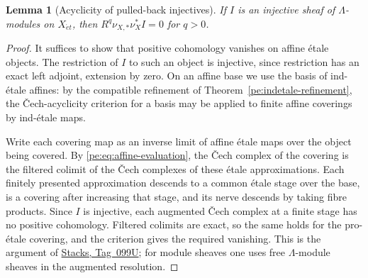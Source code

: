 \documentclass[11pt,a4paper]{article}
\numberwithin{equation}{section}
\newtheorem{lemma}[theorem]{Lemma}
\theoremstyle{definition}
\theoremstyle{remark}
\newcommand{\et}{\acute{e}t}
\newcommand{\stacks}[1]{\href{https://stacks.math.columbia.edu/tag/#1}{\textnormal{Stacks, Tag~#1}}}
\begin{document}
\begin{lemma}[Acyclicity of pulled-back injectives]
\label{pe:injective-acyclicity}
If $I$ is an injective sheaf of $\Lambda$-modules on $X_{\et}$, then
$R^q\nu_{X,*}\nu_X^*I=0$ for $q>0$.
\end{lemma}
\begin{proof}
It suffices to show that positive cohomology vanishes on affine
\'etale objects. The restriction of $I$ to such an object is
injective, since restriction has an exact left adjoint, extension by
zero. On an affine base we use the basis of ind-\'etale affines: by
the compatible refinement of Theorem~\ref{pe:indetale-refinement},
the \v{C}ech-acyclicity criterion for a basis may be applied to finite
affine coverings by ind-\'etale maps.

Write each covering map as an inverse limit of affine \'etale maps
over the object being covered. By \eqref{pe:eq:affine-evaluation}, the
\v{C}ech complex of the covering is the filtered colimit of the
\v{C}ech complexes of these \'etale approximations. Each finitely
presented approximation descends to a common \'etale stage over the
base, is a covering after increasing that stage, and its nerve
descends by taking fibre products. Since $I$ is injective, each
augmented \v{C}ech complex at a finite stage has no positive
cohomology. Filtered colimits are exact, so the same holds for the
pro-\'etale covering, and the criterion gives the required vanishing.
This is the argument of \stacks{099U}; for module sheaves one uses
free $\Lambda$-module sheaves in the augmented resolution.
\end{proof}
\end{document}
